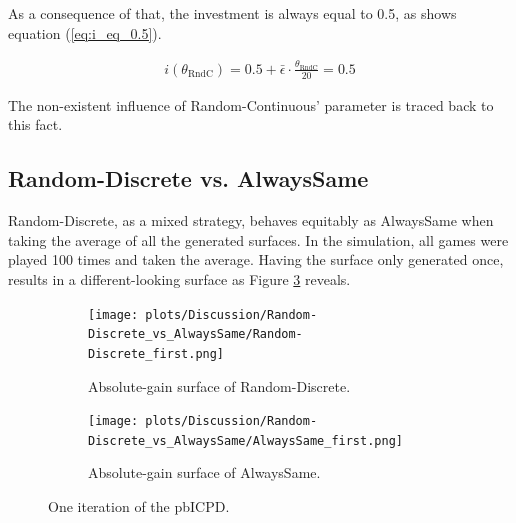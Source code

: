 \documentclass[11pt]{article}
\begin{document}
	As a consequence of that, the investment is always equal to 0.5, as shows equation (\ref{eq:i_eq_0.5}).

	\begin{equation}
		\begin{split}
			i(\theta_{\mathrm{RndC}}) = 0.5 + \bar \epsilon \cdot \frac{\theta_{\mathrm{RndC}}}{20} = 0.5
		\end{split}
		\label{eq:i_eq_0.5}
	\end{equation}

	The non-existent influence of Random-Continuous' parameter is traced back to this fact.


\subsection{Random-Discrete vs. AlwaysSame} \label{sec:RndD_vs_AlwS}
	
	Random-Discrete, as a mixed strategy, behaves equitably as AlwaysSame when taking the average of all the generated surfaces.
	In the simulation, all games were played 100 times and taken the average.
	Having the surface only generated once, results in a different-looking surface as Figure \ref{fig:two_one-iter} reveals.\\

	\begin{figure}[h]
		\centering
		\begin{subfigure}[t]{0.45\textwidth}
			\centering
			\texttt{[image: plots/Discussion/Random-Discrete\_vs\_AlwaysSame/Random-Discrete\_first.png]}
			\caption{Absolute-gain surface of Random-Discrete.}
			\label{fig:RNDD_one-iter}
		\end{subfigure}\hfill
		\begin{subfigure}[t]{0.45\textwidth}
			\centering
			\texttt{[image: plots/Discussion/Random-Discrete\_vs\_AlwaysSame/AlwaysSame\_first.png]}\\
			\caption{Absolute-gain surface of AlwaysSame.}
			\label{fig:ALWS_one-iter}
		\end{subfigure}
		\caption{One iteration of the pbICPD.}
		\label{fig:two_one-iter}
	\end{figure}
\end{document}
